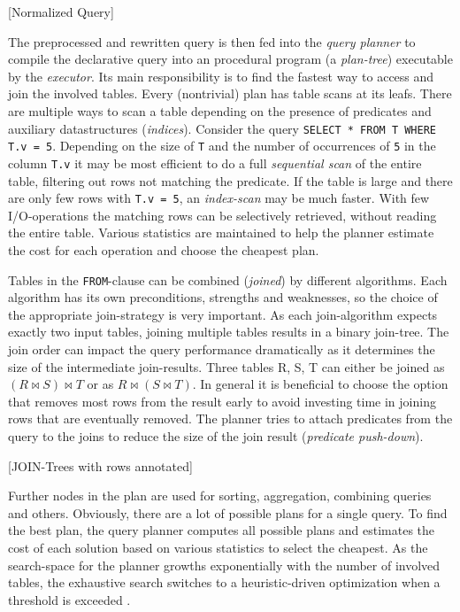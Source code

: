 [Normalized Query]

The preprocessed and rewritten query is then fed into the \textit{query planner} to compile the declarative query into an procedural program (a \textit{plan-tree}) executable by the \textit{executor}. Its main responsibility is to find the fastest way to access and join the involved tables. Every (nontrivial) plan has table scans at its leafs. There are multiple ways to scan a table depending on the presence of predicates and auxiliary datastructures (\textit{indices}). Consider the query \texttt{SELECT * FROM T WHERE T.v = 5}. Depending on the size of \texttt{T} and the number of occurrences of \texttt{5} in the column \texttt{T.v} it may be most efficient to do a full \textit{sequential scan} of the entire table, filtering out rows not matching the predicate. If the table is large and there are only few rows with \texttt{T.v = 5}, an \textit{index-scan} may be much faster. With few I/O-operations the matching rows can be selectively retrieved, without reading the entire table. Various statistics are maintained to help the planner estimate the cost for each operation and choose the cheapest plan. \cite[p. 1887]{psql}


Tables in the \texttt{FROM}-clause can be combined (\textit{joined}) by different algorithms. Each algorithm has its own preconditions, strengths and weaknesses, so the choice of the appropriate join-strategy is very important. As each join-algorithm expects exactly two input tables, joining multiple tables results in a binary join-tree. The join order can impact the query performance dramatically as it determines the size of the intermediate join-results. Three tables R, S, T can either be joined as $(R \bowtie S) \bowtie T$ or as $R \bowtie (S \bowtie T)$. In general it is beneficial to choose the option that removes most rows from the result early to avoid investing time in joining rows that are eventually removed. The planner tries to attach predicates from the query to the joins to reduce the size of the join result (\textit{predicate push-down}).

[JOIN-Trees with rows annotated]

Further nodes in the plan are used for sorting, aggregation, combining queries and others. Obviously, there are a lot of possible plans for a single query. To find the best plan, the query planner computes all possible plans and estimates the cost of each solution based on various statistics to select the cheapest. As the search-space for the planner growths exponentially with the number of involved tables, the exhaustive search switches to a heuristic-driven optimization when a threshold is exceeded \cite[p. 2064 ff.]{psql}.

